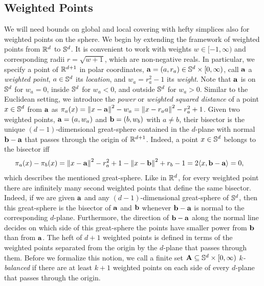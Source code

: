\documentclass[a4paper,UKenglish,cleveref, autoref,numberwithinsect]{socg-lipics-v2021}
\newcommand {\mm}[1] {\ifmmode{#1}\else{\mbox{\(#1\)}}\fi}
\newcommand {\scalprod}[2] {{\langle #1 , #2 \rangle}}
\theoremstyle{plain}
\newcommand{\Rspace}        {\mm{{\mathbb R}}}
\newcommand{\Sspace}        {\mm{{\mathbb S}}}
\newcommand{\AAA}           {\mm{\bf A}}
\newcommand{\aaa}           {\mm{\bf a}}
\newcommand{\bbb}           {\mm{\bf b}}
\newcommand{\wdist}[2]      {\mm{\pi_{#1}{({#2})}}}
\newcommand{\Edist}[2]      {\mm{\|{#1}-{#2}\|}}
\begin{document}
\subsection{Weighted Points}
\label{sec:3.2}
We will need bounds on global and local covering with hefty simplices also for weighted points on the sphere.
We begin by extending the framework of weighted points from $\Rspace^d$ to $\Sspace^d$.
It is convenient to work with weights $w \in [-1, \infty)$ and corresponding radii $r = \sqrt{w+1}$, which are non-negative reals.
In particular, we specify a point of $\Rspace^{d+1}$ in polar coordinates, $\aaa = (a, r_a) \in \Sspace^d \times [0,\infty)$, call $\aaa$ a \emph{weighted point}, $a \in \Sspace^d$ its \emph{location}, and $w_a = r_a^2 - 1$ its \emph{weight}.
Note that $\aaa$ is on $\Sspace^d$ for $w_a = 0$, inside $\Sspace^d$ for $w_a < 0$, and outside $\Sspace^d$ for $w_a > 0$.
Similar to the Euclidean setting, we introduce the \emph{power} or \emph{weighted squared distance} of a point $x \in \Sspace^d$ from $\aaa$ as $\wdist{a}{x} = \Edist{x}{\aaa}^2 - w_a = \Edist{x}{r_a a}^2 - r_a^2 + 1$.
%
Given two weighted points, $\aaa = (a, w_a)$ and $\bbb = (b, w_b)$ with $a\neq b$, their bisector is the unique $(d-1)$-dimensional great-sphere contained in the $d$-plane with normal $\bbb - \aaa$ that passes through the origin of $\Rspace^{d+1}$.
Indeed, a point $x \in \Sspace^d$ belongs to the bisector iff
\begin{align}
  \wdist{a}{x} - \wdist{b}{x}
    &= \Edist{x}{\aaa}^2 - r_a^2 + 1 - \Edist{x}{\bbb}^2 + r_b - 1
    = 2 \scalprod{x}{\bbb - \aaa} = 0,
  \label{eqn:bisector}
\end{align}
which describes the mentioned great-sphere.
Like in $\Rspace^d$, for every weighted point there are infinitely many second weighted points that define the same bisector.
Indeed, if we are given $\aaa$ and any $(d-1)$-dimensional great-sphere of $\Sspace^d$, then this great-sphere is the bisector of $\aaa$ and $\bbb$ whenever $\bbb - \aaa$ is normal to the corresponding $d$-plane.
Furthermore, the direction of $\bbb - \aaa$ along the normal line decides on which side of this great-sphere the points have smaller power from $\bbb$ than from $\aaa$.
\smallskip
The heft of $d+1$ weighted points is defined in terms of the weighted points separated from the origin by the $d$-plane that passes through them.
Before we formalize this notion, we call a finite set $\AAA \subseteq \Sspace^d \times [0, \infty)$ \emph{$k$-balanced} if there are at least $k+1$ weighted points on each side of every $d$-plane that passes through the origin.
\end{document}
